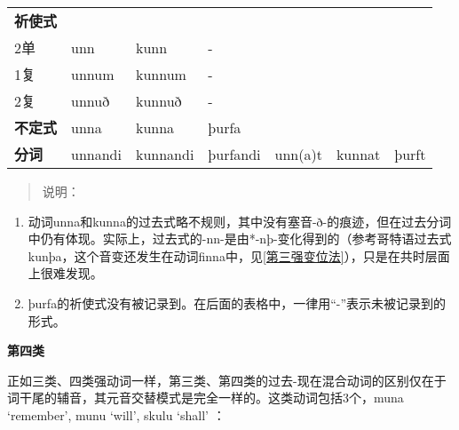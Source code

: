 \begin{longtable}{lllllll}
  \textbf{祈使式} & ~                      & ~                      & ~        & ~       & ~      & ~       \\
  2单           & unn                    & kunn                   & -        & ~       & ~      & ~       \\
  1复           & unnum                  & kunnum                 & -        & ~       & ~      & ~       \\
  2复           & unnuð                  & kunnuð                 & -        & ~       & ~      & ~       \\
  \textbf{不定式} & unna                   & kunna                  & þurfa    & ~       & ~      & ~       \\
  \textbf{分词}  & unnandi                & kunnandi               & þurfandi & unn(a)t & kunnat &
  þurft                                                                                                  \\
\end{longtable}

\begin{quote}
  说明：
\end{quote}

\begin{enumerate}
  \def\labelenumi{\arabic{enumi})}
  \item
        动词unna和kunna的过去式略不规则，其中没有塞音-ð-的痕迹，但在过去分词中仍有体现。实际上，过去式的-nn-是由*-nþ-变化得到的（参考哥特语过去式kunþa，这个音变还发生在动词finna中，见\ref{第三强变位法}），只是在共时层面上很难发现。
  \item
        þurfa的祈使式没有被记录到。在后面的表格中，一律用``-''表示未被记录到的形式。
\end{enumerate}

\textbf{第四类}

正如三类、四类强动词一样，第三类、第四类的过去-现在混合动词的区别仅在于词干尾的辅音，其元音交替模式是完全一样的。这类动词包括3个，muna
`remember‌', munu `will‌', skulu `shall‌' ：

